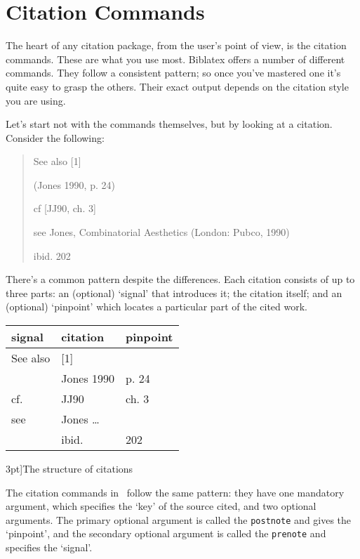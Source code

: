 \chapter{Citation Commands}\label{ch:citationcommands}


The heart of any citation package, from the user’s point of view, is
the citation commands. These are what you use most. Biblatex offers a
number of different commands. They follow a consistent pattern; so
once you’ve mastered one it’s quite easy to grasp the others. Their
exact output depends on the citation style you are using.

Let’s start not with the commands themselves, but by looking at a
citation. Consider the following:

\begin{quote}
See also [1]

(Jones 1990, p. 24)

cf [JJ90, ch. 3]

see Jones, Combinatorial Aesthetics (London: Pubco, 1990)

ibid. 202
\end{quote}

There’s a common pattern despite the differences. Each citation
consists of up to three parts: an (optional) `signal' that introduces
it; the citation itself; and an (optional) `pinpoint' which locates a
particular part of the cited work.

\begin{margintable}
\begin{tabular}{lll}
\toprule
\textsf{signal} & \textsf{citation} & \textsf{pinpoint} \\
\midrule 
See also &   [1] \\
         &   Jones 1990   & p. 24 \\
cf.      &   JJ90         & ch. 3 \\
see      &   Jones \ldots\    \\ 
         &   ibid.        &  202 \\
\bottomrule
\end{tabular}
\caption[][3pt]{The structure of citations}
\end{margintable}

The citation commands in \biblatex\ follow the same pattern: they have
one mandatory argument, which specifies the `key' of the source cited,
and two optional arguments. The primary optional argument is called
the \texttt{postnote} and gives the `pinpoint', and the secondary optional
argument is called the \texttt{prenote} and specifies the `signal'.

